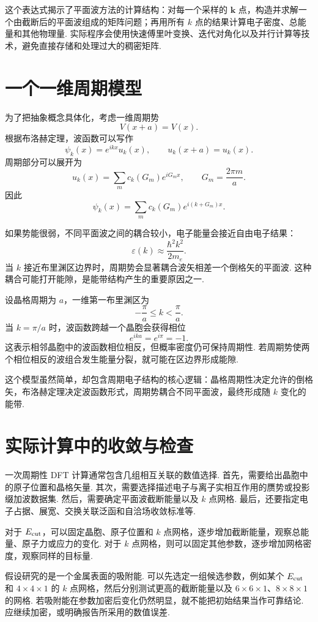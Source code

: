 \documentclass[UTF8,11pt,a4paper,openany]{ctexbook}
\begin{document}
这个表达式揭示了平面波方法的计算结构：对每一个采样的 $\mathbf k$ 点，构造并求解一个由截断后的平面波组成的矩阵问题；再用所有 $k$ 点的结果计算电子密度、总能量和其他物理量. 实际程序会使用快速傅里叶变换、迭代对角化以及并行计算等技术，避免直接存储和处理过大的稠密矩阵. 

\section{一个一维周期模型}

为了把抽象概念具体化，考虑一维周期势
\[
V(x+a)=V(x).
\]
根据布洛赫定理，波函数可以写作
\[
\psi_k(x)=e^{ikx}u_k(x),
\qquad
u_k(x+a)=u_k(x).
\]
周期部分可以展开为
\[
u_k(x)=\sum_m c_k(G_m)e^{iG_mx},
\qquad
G_m=\frac{2\pi m}{a}.
\]
因此
\[
\psi_k(x)
=
\sum_m c_k(G_m)e^{i(k+G_m)x}.
\]

如果势能很弱，不同平面波之间的耦合较小，电子能量会接近自由电子结果：
\[
\varepsilon(k)\approx \frac{\hbar^2k^2}{2m_e}.
\]
当 $k$ 接近布里渊区边界时，周期势会显著耦合波矢相差一个倒格矢的平面波. 这种耦合可能打开能隙，是能带结构产生的重要原因之一. 

\begin{examplebox}
设晶格周期为 $a$，一维第一布里渊区为
\[
-\frac{\pi}{a}\leq k<\frac{\pi}{a}.
\]
当 $k=\pi/a$ 时，波函数跨越一个晶胞会获得相位
\[
e^{ika}=e^{i\pi}=-1.
\]
这表示相邻晶胞中的波函数相位相反，但概率密度仍可保持周期性. 若周期势使两个相位相反的波组合发生能量分裂，就可能在区边界形成能隙. 
\end{examplebox}

这个模型虽然简单，却包含周期电子结构的核心逻辑：晶格周期性决定允许的倒格矢，布洛赫定理决定波函数形式，周期势耦合不同平面波，最终形成随 $k$ 变化的能带. 

\section{实际计算中的收敛与检查}

一次周期性 DFT 计算通常包含几组相互关联的数值选择. 首先，需要给出晶胞中的原子位置和晶格矢量. 其次，需要选择描述电子与离子实相互作用的赝势或投影缀加波数据集. 然后，需要确定平面波截断能量以及 $k$ 点网格. 最后，还要指定电子占据、展宽、交换关联泛函和自洽场收敛标准等. 

对于 $E_{\rm cut}$，可以固定晶胞、原子位置和 $k$ 点网格，逐步增加截断能量，观察总能量、原子力或应力的变化. 对于 $k$ 点网格，则可以固定其他参数，逐步增加网格密度，观察同样的目标量. 

\begin{examplebox}
假设研究的是一个金属表面的吸附能. 可以先选定一组候选参数，例如某个 $E_{\rm cut}$ 和 $4\times4\times1$ 的 $k$ 点网格，然后分别测试更高的截断能量以及 $6\times6\times1$、$8\times8\times1$ 的网格. 若吸附能在参数加密后变化仍然明显，就不能把初始结果当作可靠结论. 应继续加密，或明确报告所采用的数值误差. 
\end{examplebox}
\end{document}
